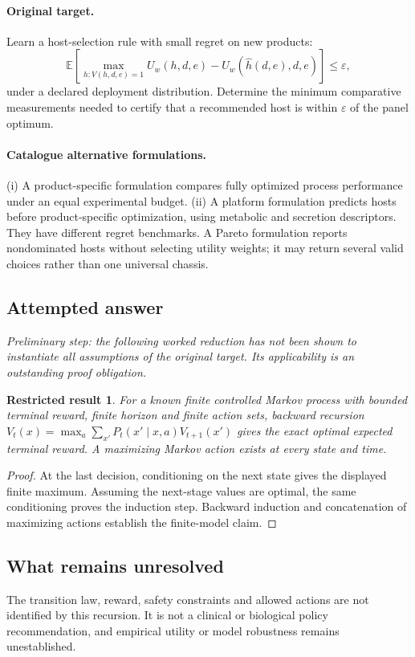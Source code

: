 \documentclass[11pt]{article}
\newcommand{\E}{\mathbb E}
\providecommand{\E}{\mathbb E}
\newtheorem{attemptresult}{Restricted result}[section]
\begin{document}
\paragraph{Original target.}
Learn a host-selection rule with small regret on new products:
\[
\E\left[\max_{h:V(h,d,e)=1}U_w(h,d,e)
-U_w(\widehat h(d,e),d,e)\right]\leq\varepsilon,
\]
under a declared deployment distribution. Determine the minimum comparative measurements needed to certify that a recommended host is within $\varepsilon$ of the panel optimum.
\paragraph{Catalogue alternative formulations.}
(i) A product-specific formulation compares fully optimized process performance under an equal experimental budget. (ii) A platform formulation predicts hosts before product-specific optimization, using metabolic and secretion descriptors. They have different regret benchmarks. A Pareto formulation reports nondominated hosts without selecting utility weights; it may return several valid choices rather than one universal chassis.
\subsection{Attempted answer}
\noindent\emph{Preliminary step: the following worked reduction has not been shown to instantiate all assumptions of the original target. Its applicability is an outstanding proof obligation.}

\begin{attemptresult}
For a known finite controlled Markov process with bounded terminal reward, finite horizon and finite action sets, backward recursion $V_t(x)=\max_a\sum_{x\prime}P_t(x\prime\mid x,a)V_{t+1}(x\prime)$ gives the exact optimal expected terminal reward. A maximizing Markov action exists at every state and time.
\end{attemptresult}
\begin{proof}
At the last decision, conditioning on the next state gives the displayed finite maximum. Assuming the next-stage values are optimal, the same conditioning proves the induction step. Backward induction and concatenation of maximizing actions establish the finite-model claim.
\end{proof}
\subsection{What remains unresolved}
The transition law, reward, safety constraints and allowed actions are not identified by this recursion. It is not a clinical or biological policy recommendation, and empirical utility or model robustness remains unestablished.
\end{document}
